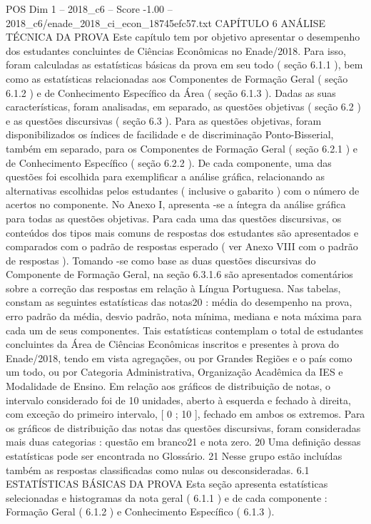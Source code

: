 \begin{textsample}{POS Dim 1 – 2018\_c6 – Score -1.00 – 2018\_c6/enade\_2018\_ci\_econ\_18745efc57.txt}  \label{ex:f1_pos_241}
CAPÍTULO 6 ANÁLISE TÉCNICA DA PROVA Este capítulo tem por objetivo apresentar o desempenho dos estudantes concluintes de Ciências Econômicas no Enade/2018.
Para isso, foram calculadas as estatísticas básicas da prova em seu todo ( seção 6.1.1 ), bem como as estatísticas relacionadas aos Componentes de Formação Geral ( seção 6.1.2 ) e de Conhecimento Específico da Área ( seção 6.1.3 ).
Dadas as suas características, foram analisadas, em separado, as questões objetivas ( seção 6.2 ) e as questões discursivas ( seção 6.3 ).
Para as questões objetivas, foram disponibilizados os índices de facilidade e de discriminação Ponto-Bisserial, também em separado, para os Componentes de Formação Geral ( seção 6.2.1 ) e de Conhecimento Específico ( seção 6.2.2 ).
De cada componente, uma das questões foi escolhida para exemplificar a análise gráfica, relacionando as alternativas escolhidas pelos estudantes ( inclusive o gabarito ) com o número de acertos no componente.
No Anexo I, apresenta -se a íntegra da análise gráfica para todas as questões objetivas.
Para cada uma das questões discursivas, os conteúdos dos tipos mais comuns de respostas dos estudantes são apresentados e comparados com o padrão de respostas esperado ( ver Anexo VIII com o padrão de respostas ).
Tomando -se como base as duas questões discursivas do Componente de Formação Geral, na seção 6.3.1.6 são apresentados comentários sobre a correção das respostas em relação à Língua Portuguesa.
Nas tabelas, constam as seguintes estatísticas das notas20 : média do desempenho na prova, erro padrão da média, desvio padrão, nota mínima, mediana e nota máxima para cada um de seus componentes.
Tais estatísticas contemplam o total de estudantes concluintes da Área de Ciências Econômicas inscritos e presentes à prova do Enade/2018, tendo em vista agregações, ou por Grandes Regiões e o país como um todo, ou por Categoria Administrativa, Organização Acadêmica da IES e Modalidade de Ensino.
Em relação aos gráficos de distribuição de notas, o intervalo considerado foi de 10 unidades, aberto à esquerda e fechado à direita, com exceção do primeiro intervalo, [ 0 ; 10 ], fechado em ambos os extremos.
Para os gráficos de distribuição das notas das questões discursivas, foram consideradas mais duas categorias : questão em branco21 e nota zero. 20 Uma definição dessas estatísticas pode ser encontrada no Glossário. 21 Nesse grupo estão incluídas também as respostas classificadas como nulas ou desconsideradas. 6.1 ESTATÍSTICAS BÁSICAS DA PROVA Esta seção apresenta estatísticas selecionadas e histogramas da nota geral ( 6.1.1 ) e de cada componente : Formação Geral ( 6.1.2 ) e Conhecimento Específico ( 6.1.3 ).

\end{textsample}
